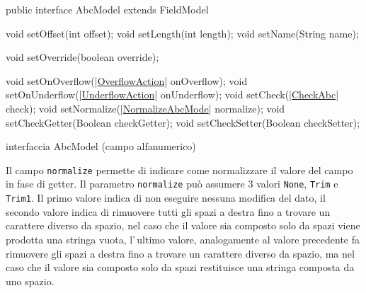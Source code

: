 \documentclass[a4paper,10pt]{report}
\newif\ifesource
\newenvironment{elisting}[1][!htb]
  {\captionsetup{aboveskip=0pt}\begin{listing}[#1]}
  {\end{listing}%
}
\begin{document}
\ifesource
\begin{figure*}[!htb]
\begin{lstlisting}[language=java, 
caption=interfaccia AbcModel (campo alfanumerico), 
label=lst:AbcModel]
public interface AbcModel extends FieldModel {
    void setOffset(int offset);
    void setLength(int length);
    void setName(String name);

    void setOverride(boolean override);

    void setOnOverflow((*\hyperref[lst:OverflowAction]{OverflowAction}*) onOverflow);
    void setOnUnderflow((*\hyperref[lst:UnderflowAction]{UnderflowAction}*) onUnderflow);
    void setCheck((*\hyperref[lst:CheckAbc]{CheckAbc}*) check);
    void setNormalize((*\hyperref[lst:NormalizeAbcMode]{NormalizeAbcMode}*) normalize);
    void setCheckGetter(Boolean checkGetter);
    void setCheckSetter(Boolean checkSetter);
}
\end{lstlisting}\index{AbcModel}
\end{figure*}
\else
\begin{elisting}
\begin{javacode}
public interface AbcModel extends FieldModel {
    void setOffset(int offset);
    void setLength(int length);
    void setName(String name);

    void setOverride(boolean override);

    void setOnOverflow(|\hyperref[lst:OverflowAction]{OverflowAction}| onOverflow);
    void setOnUnderflow(|\hyperref[lst:UnderflowAction]{UnderflowAction}| onUnderflow);
    void setCheck(|\hyperref[lst:CheckAbc]{CheckAbc}| check);
    void setNormalize(|\hyperref[lst:NormalizeAbcMode]{NormalizeAbcMode}| normalize);
    void setCheckGetter(Boolean checkGetter);
    void setCheckSetter(Boolean checkSetter);
}
\end{javacode}
\caption{interfaccia AbcModel (campo alfanumerico)}
\label{lst:AbcModel}
\end{elisting}
\fi

Il campo \hypertarget{abc:nrm}{\texttt{normalize}} permette di indicare come 
normalizzare il valore del campo in fase di getter.
Il parametro \verb!normalize! può assumere 3 valori \verb!None!, \verb!Trim! e
\verb!Trim1!. Il primo valore indica di non eseguire nessuna modifica del dato,
il secondo valore indica di rimuovere tutti gli spazi a destra fino a trovare
un carattere diverso da spazio, nel caso che il valore sia composto solo da
spazi viene prodotta una stringa vuota, l'\,ultimo valore, analogamente al 
valore precedente fa rimuovere gli spazi a destra fino a trovare un carattere
diverso da spazio, ma nel caso che il valore sia composto solo da spazi 
restituisce una stringa composta da uno spazio.
\end{document}
